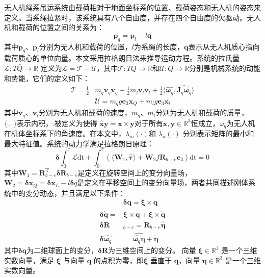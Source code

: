 \documentclass[lang=chs, degree=master, blindreview=false, winfonts=true]{yanputhesis}
\begin{document}
无人机绳系吊运系统由载荷相对于地面坐标系的位置、载荷姿态和无人机的姿态来定义。当系绳拉紧时，该系统具有八个自由度，并存在四个自由度的欠驱动。无人机和载荷的位置之间的关系为：
\begin{equation}
	\bm p_q=\bm p_l-l\bm q
	\label{2-8}
\end{equation}
其中$\bm p_q$、$\bm p_l$分别为无人机和载荷的位置，$l$为系绳的长度，$\bm q$表示从无人机质心指向载荷质心的单位向量。本文采用拉格朗日法来推导运动方程。系统的拉氏量 $\mathcal{L}:T\bar{Q}\to\mathbb{R}$ 定义为$\mathcal{L}=\mathcal{T}-\mathcal{U}$，其中$\mathcal{T}:TQ\to\mathbb{R}$和${\mathcal{U}}:Q\to\mathbb{R}$分别是机械系统的动能和势能，它们的定义如下：
\begin{equation}
\begin{aligned}
	\mathcal{T}=\frac{1}{2}&m_{q}\bm v_{q} \bm v_{q}+\frac{1}{2}m_{l}\bm v_{l} \bm v_{l}+\frac{1}{2}\langle\hat{\bm  \omega_q},\widehat{\bm J_{q}\bm  \omega_q}\rangle\\
	&\mathcal{U}=m_{q}g\bm e_{3} \bm x_{Q}+m_{l}g\bm e_{3} \bm x_{l}
\end{aligned}
	\label{2-9}
\end{equation}
其中$\bm v_q$、$\bm v_l$分别为无人机和载荷的速度，$m_q$、$m_l$分别为无人机和载荷的质量，$\langle\cdot,\cdot\rangle $表示内积，$\hat{.}$被定义为使得 $\hat{\bm x}\bm y=\bm x\times \bm y$对于所有$\bm x,\bm y\in\mathbb{R}^3$恒成立，$\omega_q$为无人机在机体坐标系下的角速度。在本文中，$\lambda_m(\cdot)$和 $\lambda_n(\cdot)$ 分别表示矩阵的最小和最大特征值。系统的动力学满足拉格朗日原理：
\begin{equation}
	\bm \delta\int_0^\tau\mathcal{L} \text{dt}+\int_0^\tau\left(\langle \bm W_1,\hat{\bm \tau}\rangle+\bm W_2 f\bm{R}_{b-e}\bm e_3\right) \text{dt}=0
	\label{2-10}
\end{equation}
其中$\bm W_{1}=\bm R_{b-e}^\mathrm{T}\bm \delta \bm R_{b-e}$是定义在旋转空间上的变分向量场， $ \bm W_{2}=\bm \delta \bm x_{Q}=\bm \delta \bm x_{L}-l\bm \delta q$是定义在平移空间上的变分向量场，两者共同描述刚体系统中的变分动态，并且满足以下条件：
\begin{equation}
	\begin{aligned}
	&\bm \delta \bm q = \bm \xi \times \bm q\\
	\bm \delta \dot{\bm q} = &\dot{\bm \xi} \times \bm q + \bm \xi \times \dot{\bm q} \\
	\bm \delta\bm  R&_{b-e} = \bm R_{b-e} \hat{\bm \eta} \\
	\bm \delta \hat{\bm  \omega _q}& = \widehat{\hat{\bm  \omega_q} \bm \eta} + \hat{\dot{\bm \eta}}
\end{aligned}
\end{equation}
其中$\bm \delta \bm q$为二维球面上的变分，$\bm \delta \bm R$为三维空间上的变分。
向量 $\bm{\xi} \in \mathbb{R}^3$ 是一个三维实数向量，满足 $\bm{\xi}$ 与向量 $\bm{q}$ 的点积为零，即$\bm{\xi}$ 垂直于 $\bm{q}$，向量 $\bm{\eta} \in \mathbb{R}^3$ 是一个三维实数向量。
\end{document}
